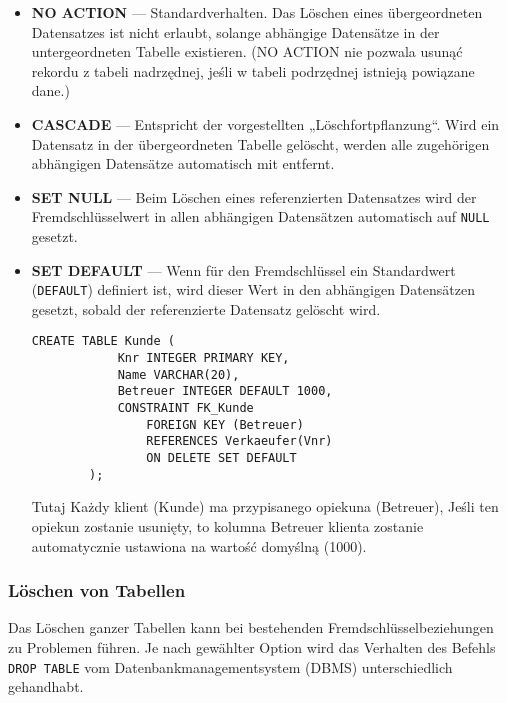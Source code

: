 \begin{itemize}
    \item \textbf{NO ACTION} — Standardverhalten. 
    Das Löschen eines übergeordneten Datensatzes ist nicht erlaubt, 
    solange abhängige Datensätze in der untergeordneten Tabelle existieren. (NO ACTION nie pozwala usunąć rekordu z tabeli nadrzędnej, jeśli w tabeli podrzędnej istnieją powiązane dane.)
    
    \item \textbf{CASCADE} — Entspricht der vorgestellten „Löschfortpflanzung“. 
    Wird ein Datensatz in der übergeordneten Tabelle gelöscht, 
    werden alle zugehörigen abhängigen Datensätze automatisch mit entfernt.
    
    \item \textbf{SET NULL} — Beim Löschen eines referenzierten Datensatzes 
    wird der Fremdschlüsselwert in allen abhängigen Datensätzen automatisch auf \texttt{NULL} gesetzt.
    
    \item \textbf{SET DEFAULT} — Wenn für den Fremdschlüssel ein Standardwert (\texttt{DEFAULT}) definiert ist, 
    wird dieser Wert in den abhängigen Datensätzen gesetzt, 
    sobald der referenzierte Datensatz gelöscht wird.

    \begin{lstlisting}[style=sqlstyle]
        CREATE TABLE Kunde (
            Knr INTEGER PRIMARY KEY,
            Name VARCHAR(20),
            Betreuer INTEGER DEFAULT 1000,
            CONSTRAINT FK_Kunde
                FOREIGN KEY (Betreuer)
                REFERENCES Verkaeufer(Vnr)
                ON DELETE SET DEFAULT
        );
    \end{lstlisting}
        Tutaj Każdy klient (Kunde) ma przypisanego opiekuna (Betreuer), Jeśli ten opiekun zostanie usunięty, to kolumna Betreuer klienta zostanie automatycznie ustawiona na wartość domyślną (1000).
    \end{itemize}
\subsubsection{Löschen von Tabellen}

Das Löschen ganzer Tabellen kann bei bestehenden Fremdschlüsselbeziehungen zu Problemen führen. 
Je nach gewählter Option wird das Verhalten des Befehls \texttt{DROP TABLE} vom Datenbankmanagementsystem (DBMS) unterschiedlich gehandhabt.


